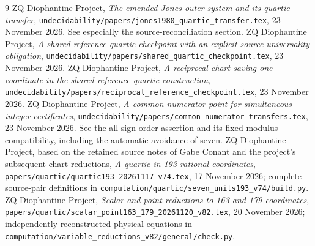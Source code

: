 \documentclass[11pt]{article}
\begin{document}
\begin{thebibliography}{9}
 ZQ Diophantine Project,
\emph{The emended Jones outer system and its quartic transfer},
\nolinkurl{undecidability/papers/jones1980_quartic_transfer.tex},
23 November 2026. See especially the source-reconciliation section.
 ZQ Diophantine Project,
\emph{A shared-reference quartic checkpoint with an explicit
source-universality obligation},
\nolinkurl{undecidability/papers/shared_quartic_checkpoint.tex},
23 November 2026.
 ZQ Diophantine Project,
\emph{A reciprocal chart saving one coordinate in the shared-reference
quartic construction},
\nolinkurl{undecidability/papers/reciprocal_reference_checkpoint.tex},
23 November 2026.
 ZQ Diophantine Project,
\emph{A common numerator point for simultaneous integer certificates},
\nolinkurl{undecidability/papers/common_numerator_transfers.tex},
23 November 2026. See the all-sign order assertion and its
fixed-modulus compatibility, including the automatic avoidance of seven.
 ZQ Diophantine Project, based on the retained source
notes of Gabe Conant and the project's subsequent chart reductions,
\emph{A quartic in 193 rational coordinates},
\nolinkurl{papers/quartic/quartic193_20261117_v74.tex},
17 November 2026; complete source-pair definitions in
\nolinkurl{computation/quartic/seven_units193_v74/build.py}.
 ZQ Diophantine Project,
\emph{Scalar and point reductions to 163 and 179 coordinates},
\nolinkurl{papers/quartic/scalar_point163_179_20261120_v82.tex},
20 November 2026; independently reconstructed physical equations in
\nolinkurl{computation/variable_reductions_v82/general/check.py}.
\end{thebibliography}
\end{document}
